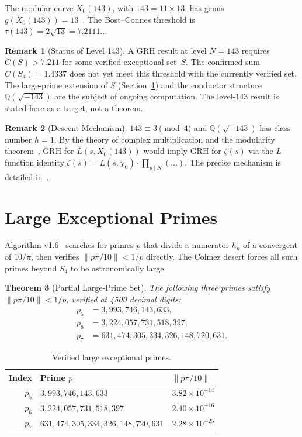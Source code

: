 \documentclass[11pt,letterpaper]{article}
\newtheorem{theorem}{Theorem}[section]
\theoremstyle{definition}
\newtheorem{remark}[theorem]{Remark}
\begin{document}
The modular curve $X_0(143)$, with $143 = 11 \times 13$, has genus
$g(X_0(143)) = 13$~\cite{LMFDB}.
The Bost--Connes threshold is $\tau(143) = 2\sqrt{13} = 7.2111\ldots$

\begin{remark}[Status of Level 143]
A GRH result at level $N = 143$ requires $C(S) > 7.211$ for some verified exceptional
set~$S$.
The confirmed sum $C(S_4) = 1.4337$ does not yet meet this threshold with the
currently verified set.
The large-prime extension of $S$ (Section~\ref{sec:large}) and the conductor
structure $\mathbb{Q}(\sqrt{-143})$ are the subject of ongoing computation.
The level-143 result is stated here as a target, not a theorem.
\end{remark}

\begin{remark}[Descent Mechanism]
$143 \equiv 3 \pmod{4}$ and $\mathbb{Q}(\sqrt{-143})$ has class number $h = 1$.
By the theory of complex multiplication and the modularity theorem~\cite{TW95,Wiles95},
GRH for $L(s, X_0(143))$ would imply GRH for $\zeta(s)$ via the $L$-function identity
$\zeta(s) = L(s, \chi_0) \cdot \prod_{p \mid N} (\ldots)$.
The precise mechanism is detailed in~\cite{Diamond97}.
\end{remark}

\section{Large Exceptional Primes}\label{sec:large}

Algorithm v1.6~\cite{Fox26} searches for primes $p$ that divide a numerator $h_n$ of
a convergent of $10/\pi$, then verifies $\|p\pi/10\| < 1/p$ directly.
The Colmez desert forces all such primes beyond $S_4$ to be astronomically large.

\begin{theorem}[Partial Large-Prime Set]
The following three primes satisfy $\|p\pi/10\| < 1/p$, verified at 4500 decimal digits:
\begin{align*}
  p_5 &= 3{,}993{,}746{,}143{,}633, \\
  p_6 &= 3{,}224{,}057{,}731{,}518{,}397, \\
  p_7 &= 631{,}474{,}305{,}334{,}326{,}148{,}720{,}631.
\end{align*}
\end{theorem}

\begin{table}[ht]
\centering
\caption{Verified large exceptional primes.}
\begin{tabular}{rll@{}}
\hline
Index & Prime $p$ & $\|p\pi/10\|$ \\
\hline
$p_5$ & $3{,}993{,}746{,}143{,}633$               & $3.82 \times 10^{-14}$ \\
$p_6$ & $3{,}224{,}057{,}731{,}518{,}397$         & $2.40 \times 10^{-16}$ \\
$p_7$ & $631{,}474{,}305{,}334{,}326{,}148{,}720{,}631$ & $2.28 \times 10^{-25}$ \\
\hline
\end{tabular}
\end{table}
\end{document}
